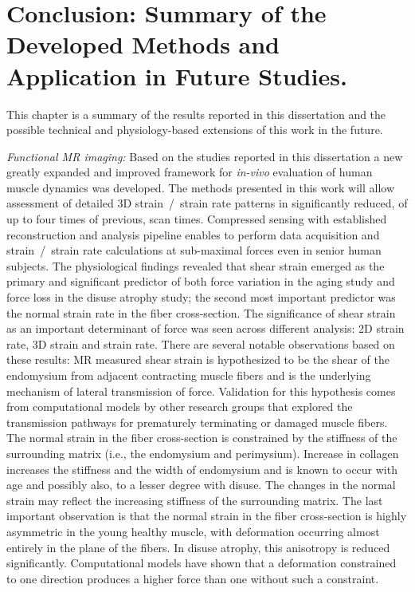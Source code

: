 \chapter{Conclusion: Summary of the Developed Methods and Application in Future Studies.}
This chapter is a summary of the results reported in this dissertation and the possible technical and physiology-based extensions of this work in the future. 

\textit{Functional MR imaging:} Based on the studies reported in this dissertation a new greatly expanded and improved framework for \textit{in-vivo} evaluation of human muscle dynamics was developed.
The methods presented in this work will allow assessment of detailed 3D strain~/~strain rate patterns in significantly reduced, of up to four times of previous, scan times.
Compressed sensing with established reconstruction and analysis pipeline enables to perform data acquisition and strain~/~strain rate calculations at sub-maximal forces even in senior human subjects.
The physiological findings revealed that shear strain emerged as the primary and significant predictor of both force variation in the aging study and force loss in the disuse atrophy study; the second most important predictor was the normal strain rate in the fiber cross-section. 
The significance of shear strain as an important determinant of force was seen across different analysis: 2D strain rate, 3D strain and strain rate. 
There are several notable observations based on these results: MR measured shear strain is hypothesized to be the shear of the endomysium from adjacent contracting muscle fibers and is the underlying mechanism of lateral transmission of force. 
Validation for this hypothesis comes from computational models by other research groups that explored the transmission pathways for prematurely terminating or damaged muscle fibers. 
The normal strain in the fiber cross-section is constrained by the stiffness of the surrounding matrix (i.e., the endomysium and perimysium). 
Increase in collagen increases the stiffness and the width of endomysium and is known to occur with age and possibly also, to a lesser degree with disuse. 
The changes in the normal strain may reflect the increasing stiffness of the surrounding matrix. 
The last important observation is that the normal strain in the fiber cross-section is highly asymmetric in the young healthy muscle, with deformation occurring almost entirely in the plane of the fibers. 
In disuse atrophy, this anisotropy is reduced significantly. 
Computational models have shown that a deformation constrained to one direction produces a higher force than one without such a constraint. 
